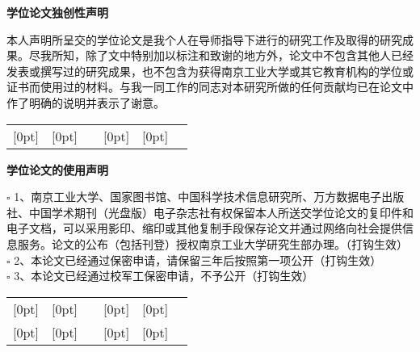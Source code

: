   
{
	\pagestyle{empty}
	\newpage
	\setlength{\parindent}{0pt} %
	\vspace*{20pt}
	\begin{center}{\songti \textbf{学位论文独创性声明}}\end{center}
	\par\vspace*{30pt}
	\renewcommand{\baselinestretch}{2}
	{ \songti %
		
		
		本人声明所呈交的学位论文是我个人在导师指导下进行的研究工作及取得的研究成果。尽我所知，除了文中特别加以标注和致谢的地方外，论文中不包含其他人已经发表或撰写过的研究成果，也不包含为获得南京工业大学或其它教育机构的学位或证书而使用过的材料。与我一同工作的同志对本研究所做的任何贡献均已在论文中作了明确的说明并表示了谢意。 
		
		\begin{tabular}{lp{3cm}p{0cm}lp{3cm}l}
			\raisebox{-0.5ex}[0pt]{\makebox[2.5cm][s]{研\hfill 究\hfill \hfill 生\hfill 签\hfill 名：}} & {}\hfill\raisebox{-0.5ex}[0pt]{}\hfill{} &  &
			\raisebox{-0.5ex}[0pt]{\makebox[2.5cm][s]{日\hfill 期：}} & {}\hfill\raisebox{-0.5ex}[0pt]{}\hfill{} & \\\cline{2-2}\cline{5-5}
		\end{tabular}
		
		
		\vskip2cm
		\par
	}
	
	\begin{center}{\songti \textbf{学位论文的使用声明}}\end{center}
	\par\vspace*{30pt}
	\renewcommand{\baselinestretch}{2}
	{ \songti %
		
		
		$ \square  $  1、南京工业大学、国家图书馆、中国科学技术信息研究所、万方数据电子出版社、中国学术期刊（光盘版）电子杂志社有权保留本人所送交学位论文的复印件和电子文档，可以采用影印、缩印或其他复制手段保存论文并通过网络向社会提供信息服务。论文的公布（包括刊登）授权南京工业大学研究生部办理。（打钩生效）\\
		$ \square  $  2、本论文已经通过保密申请，请保留三年后按照第一项公开（打钩生效）\\
		$ \square  $  3、本论文已经通过校军工保密申请，不予公开（打钩生效）
		
		
		\begin{tabular}{lp{3cm}p{0cm}lp{3cm}l}
			\raisebox{-0.5ex}[0pt]{\makebox[2.5cm][s]{研\hfill 究\hfill \hfill 生\hfill 签\hfill 名：}} & {}\hfill\raisebox{-0.5ex}[0pt]{}\hfill{} &  &
			\raisebox{-0.5ex}[0pt]{\makebox[2.5cm][s]{导\hfill 师\hfill 签\hfill 名\hfill ：}} & {}\hfill\raisebox{-0.5ex}[0pt]{}\hfill{} & \\\cline{2-2}\cline{5-5}
			\raisebox{-0.5ex}[0pt]{\makebox[2.5cm][s]{日\hfill 期：}} & {}\hfill\raisebox{-0.5ex}[0pt]{}\hfill{} &  &
			\raisebox{-0.5ex}[0pt]{\makebox[2.5cm][s]{日\hfill 期：}} & {}\hfill\raisebox{-0.5ex}[0pt]{}\hfill{} & \\\cline{2-2}\cline{5-5}
		\end{tabular}
	
}}
